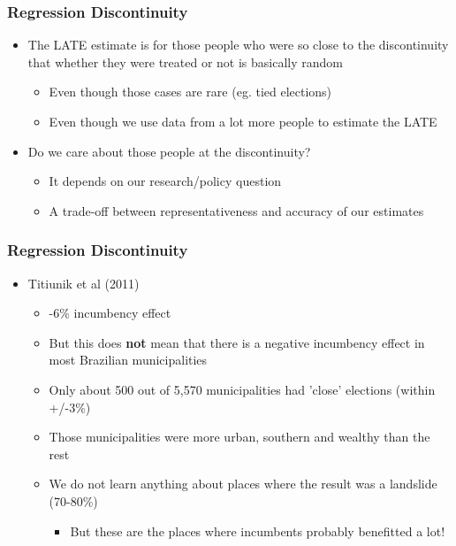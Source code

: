 \documentclass[xcolor=x11names,compress]{beamer}\usepackage[]{graphicx}\usepackage[]{color}
\renewcommand{\(}{\begin{columns}}
\renewcommand{\)}{\end{columns}}
\newcommand{\<}[1]{\begin{column}{#1}}
\renewcommand{\>}{\end{column}}
\begin{document}
\begin{frame}
\frametitle{Regression Discontinuity}
\begin{itemize}
\item The LATE estimate is for those people who were so close to the discontinuity that whether they were treated or not is basically random
\pause
\begin{itemize}
\item Even though those cases are rare (eg. tied elections)
\pause
\item Even though we use data from a lot more people to estimate the LATE
\pause
\end{itemize}
\item Do we care about those people at the discontinuity?
\pause
\begin{itemize}
\item It depends on our research/policy question
\pause
\item A trade-off between representativeness and accuracy of our estimates
\end{itemize}
\end{itemize}
\end{frame}

\begin{frame}
\frametitle{Regression Discontinuity}
\begin{itemize}
\item Titiunik et al (2011) 
\pause
\begin{itemize}
\item -6\% incumbency effect
\pause
\item But this does \textbf{not} mean that there is a negative incumbency effect in most Brazilian municipalities
\pause
\item Only about 500 out of 5,570 municipalities had 'close' elections (within +/-3\%)
\pause
\item Those municipalities were more urban, southern and wealthy than the rest
\pause
\item We do not learn anything about places where the result was a landslide (70-80\%)
\pause
\begin{itemize}
\item But these are the places where incumbents probably benefitted a lot!
\end{itemize}
\end{itemize}
\end{itemize}
\end{frame}
\end{document}
